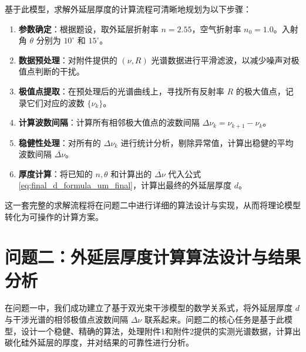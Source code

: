 \documentclass[withoutpreface,bwprint]{cumcmthesis} %
\begin{document}
基于此模型，求解外延层厚度的计算流程可清晰地规划为以下步骤：
\begin{enumerate}
    \item \textbf{参数确定}：根据题设，取外延层折射率 $n=2.55$，空气折射率 $n_0=1.0$。入射角 $\theta$ 分别为 $10^\circ$ 和 $15^\circ$。
    \item \textbf{数据预处理}：对附件提供的 $(\nu, R)$ 光谱数据进行平滑滤波，以减少噪声对极值点判断的干扰。
    \item \textbf{极值点提取}：在预处理后的光谱曲线上，寻找所有反射率 $R$ 的极大值点，记录它们对应的波数 $\{\nu_k\}$。
    \item \textbf{计算波数间隔}：计算所有相邻极大值点的波数间隔 $\Delta\nu_k = \nu_{k+1} - \nu_k$。
    \item \textbf{稳健性处理}：对所有的 $\Delta\nu_k$ 进行统计分析，剔除异常值，计算出稳健的平均波数间隔 $\overline{\Delta\nu}$。
    \item \textbf{厚度计算}：将已知的 $n, \theta$ 和计算出的 $\overline{\Delta\nu}$ 代入公式 \eqref{eq:final_d_formula_um_final}，计算出最终的外延层厚度 $d$。
\end{enumerate}
这一套完整的求解流程将在问题二中进行详细的算法设计与实现，从而将理论模型转化为可操作的计算方案。

\section{问题二：外延层厚度计算算法设计与结果分析}

在问题一中，我们成功建立了基于双光束干涉模型的数学关系式，将外延层厚度 $d$ 与干涉光谱的相邻极值点波数间隔 $\Delta\nu$ 联系起来。问题二的核心任务是基于此模型，设计一个稳健、精确的算法，处理附件1和附件2提供的实测光谱数据，计算出碳化硅外延层的厚度，并对结果的可靠性进行分析。
\end{document}
